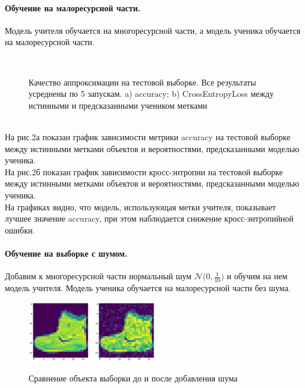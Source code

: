 \paragraph{Обучение на малоресурсной части.}
Модель учителя обучается на многоресурсной части, а модель ученика обучается на малоресурсной части.\\
\begin{figure}[h!t]\center
{}
\\
\caption{Качество аппроксимации на тестовой выборке. Все результаты усреднены по 5 запускам. a) accuracy; b) CrossEntropyLoss между истинными и предсказанными учеником метками}
\end{figure}\\
На рис.2а показан график зависимости метрики accuracy на тестовой выборке между истинными метками объектов и вероятностями, предсказанными моделью ученика.\\
На рис.2б показан график зависимости кросс-энтропии на тестовой выборке между истинными метками объектов и вероятностями, предсказанными моделью ученика.\\
На графиках видно, что модель, использующая метки учителя, показывает лучшее значение accuracy, при этом наблюдается снижение кросс-энтропийной ошибки.

\newpage
\paragraph{Обучение на выборке с шумом.}
Добавим к многоресурсной части нормальный шум $\mathcal{N}\bigr(0,\frac{1}{10}\bigr)$ и обучим на нем модель учителя. Модель ученика обучается на малоресурсной части без шума.
\begin{figure}[h!t]\center
{\includegraphics[width=0.5\textwidth]{results/noise}}
\caption{Сравнение объекта выборки до и после добавления шума}
\end{figure}\\

